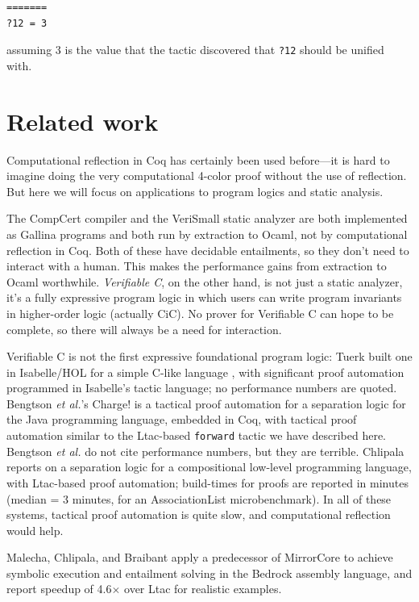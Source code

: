 \documentclass{puthesis}
\begin{document}
\begin{lstlisting}
=======
?12 = 3
\end{lstlisting}

assuming $3$ is the value that the tactic discovered that
\lstinline|?12| should be unified with.

\section{Related work}
Computational reflection in Coq has certainly been used before---it is
hard to imagine doing the very computational 4-color proof
\cite{gonthier2008formal} without the use of reflection.  But here we
will focus on applications to program logics and static analysis.

The CompCert compiler \cite{leroy09} and the VeriSmall static analyzer
\cite{appel11:cpp} are both implemented as Gallina programs and both
run by extraction to Ocaml, not by computational reflection in Coq.
Both of these have decidable entailments, so they don't need to
interact with a human. This makes the performance gains from
extraction to Ocaml worthwhile. \emph{Verifiable C}, on the other
hand, is not just a static analyzer, it's a fully expressive program
logic in which users can write program invariants in higher-order
logic (actually CiC). No prover for Verifiable C can hope to be
complete, so there will always be a need for interaction.

Verifiable C is not the first expressive foundational program logic:
Tuerk built one in Isabelle/HOL for a simple C-like language
\cite{Tuer09}, with significant proof automation programmed in
Isabelle's tactic language; no performance numbers are quoted.
Bengtson \emph{et al.}'s Charge! \cite{bengtson12:Charge} is a
tactical proof automation for a separation logic for the Java
programming language, embedded in Coq, with tactical proof automation
similar to the Ltac-based \lstinline{forward} tactic we have described
here.  Bengtson \emph{et al.} do not cite performance numbers, but
they are terrible.  Chlipala \cite{chlipala11:pldi} reports on a
separation logic for a compositional low-level programming language,
with Ltac-based proof automation; build-times for proofs are reported
in minutes (median = 3 minutes, for an AssociationList
microbenchmark).  In all of these systems, tactical proof automation
is quite slow, and computational reflection would help.

Malecha, Chlipala, and Braibant \cite{malecha2014compositional} apply a
predecessor of MirrorCore to achieve symbolic execution and entailment
solving in the Bedrock assembly language, and report speedup of
4.6$\times$ over Ltac for realistic examples. 
\end{document}
